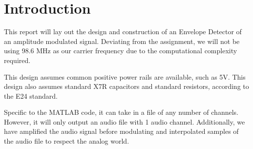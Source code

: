 \section{Introduction}

This report will lay out the design and construction of an Envelope Detector of an amplitude modulated signal. Deviating from the assignment, we will not be using 98.6 MHz as our carrier frequency due to the computational complexity required. 

This design assumes common positive power rails are available, such as 5V. This design also assumes standard X7R capacitors and standard resistors, according to the E24 standard.

Specific to the MATLAB code, it can take in a file of any number of channels. However, it will only output an audio file with 1 audio channel. Additionally, we have amplified the audio signal before modulating and interpolated samples of the audio file to respect the analog world.



